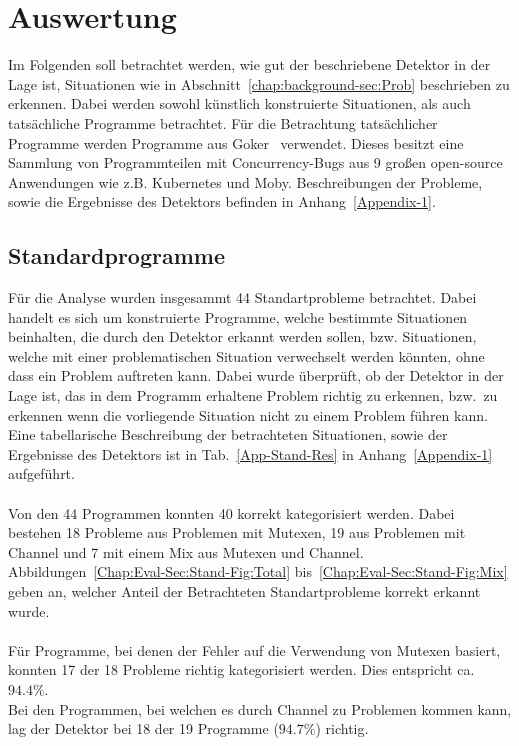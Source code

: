 \chapter{Auswertung}\label{Chap:Eval}
Im Folgenden soll betrachtet werden, wie gut der beschriebene Detektor 
in der Lage ist, Situationen wie in Abschnitt~\ref{chap:background-sec:Prob}
beschrieben zu erkennen. Dabei werden sowohl künstlich konstruierte 
Situationen, als auch tatsächliche Programme betrachtet. Für die Betrachtung 
tatsächlicher Programme werden Programme aus Goker~\cite{gobench}
verwendet. Dieses besitzt eine Sammlung von Programmteilen mit 
Concurrency-Bugs aus 9 
großen open-source Anwendungen wie z.B. Kubernetes und Moby. 
Beschreibungen der Probleme, sowie die Ergebnisse des Detektors befinden in 
Anhang~\ref{Appendix-1}.

\section{Standardprogramme}
Für die Analyse wurden insgesammt 44 Standartprobleme betrachtet. 
Dabei handelt es sich um konstruierte Programme, welche bestimmte 
Situationen beinhalten, die durch den Detektor erkannt werden sollen, 
bzw. Situationen, welche mit einer problematischen Situation verwechselt 
werden könnten, ohne dass ein Problem auftreten kann.  
Dabei wurde überprüft, ob der Detektor in der Lage ist, das in dem 
Programm erhaltene Problem richtig zu erkennen, bzw.~zu erkennen wenn 
die vorliegende Situation nicht zu einem Problem führen kann. Eine 
tabellarische Beschreibung der betrachteten Situationen, sowie der Ergebnisse 
des Detektors ist in Tab.~\ref{App-Stand-Res} in Anhang~\ref{Appendix-1} aufgeführt.\\\\
Von den 44 Programmen konnten 40 korrekt kategorisiert werden. Dabei 
bestehen 18 Probleme aus Problemen mit Mutexen,
19 aus Problemen mit Channel und 7 mit einem 
Mix aus Mutexen und Channel. Abbildungen~\ref{Chap:Eval-Sec:Stand-Fig:Total}
bis~\ref{Chap:Eval-Sec:Stand-Fig:Mix} geben an, welcher Anteil der 
Betrachteten Standartprobleme korrekt erkannt wurde.\\\\
Für Programme, bei denen der Fehler auf die Verwendung von Mutexen 
basiert, konnten 17 der 18 Probleme richtig kategorisiert werden. 
Dies entspricht ca. $94.4\%$.\\
Bei den Programmen, bei welchen es durch Channel zu Problemen kommen kann, 
lag der Detektor bei 18 der 19 Programme ($94.7\%$) richtig.\\
